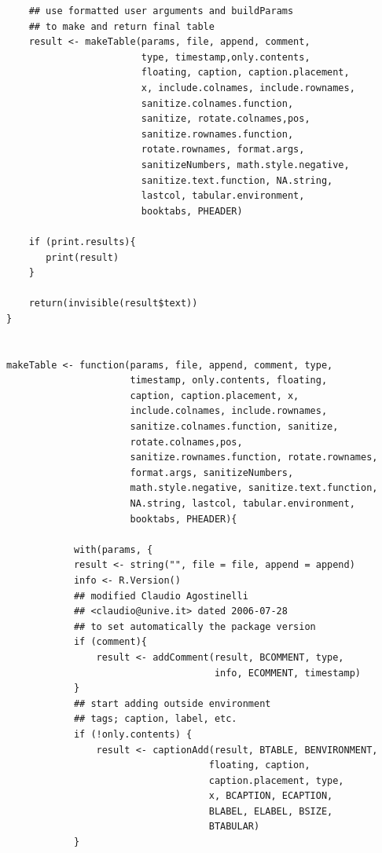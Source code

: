 \documentclass{memoir}\usepackage[]{graphicx}\usepackage[]{color}
\begin{document}
\begin{lstlisting}
    ## use formatted user arguments and buildParams 
    ## to make and return final table
    result <- makeTable(params, file, append, comment, 
                        type, timestamp,only.contents, 
                        floating, caption, caption.placement, 
                        x, include.colnames, include.rownames, 
                        sanitize.colnames.function, 
                        sanitize, rotate.colnames,pos, 
                        sanitize.rownames.function, 
                        rotate.rownames, format.args, 
                        sanitizeNumbers, math.style.negative, 
                        sanitize.text.function, NA.string, 
                        lastcol, tabular.environment, 
                        booktabs, PHEADER)

    if (print.results){
       print(result)
    }

    return(invisible(result$text))
}


makeTable <- function(params, file, append, comment, type, 
                      timestamp, only.contents, floating, 
                      caption, caption.placement, x, 
                      include.colnames, include.rownames, 
                      sanitize.colnames.function, sanitize, 
                      rotate.colnames,pos, 
                      sanitize.rownames.function, rotate.rownames, 
                      format.args, sanitizeNumbers, 
                      math.style.negative, sanitize.text.function, 
                      NA.string, lastcol, tabular.environment, 
                      booktabs, PHEADER){

            with(params, {
            result <- string("", file = file, append = append)
            info <- R.Version()
            ## modified Claudio Agostinelli 
            ## <claudio@unive.it> dated 2006-07-28
            ## to set automatically the package version
            if (comment){
                result <- addComment(result, BCOMMENT, type, 
                                     info, ECOMMENT, timestamp) 
            }
            ## start adding outside environment 
            ## tags; caption, label, etc.
            if (!only.contents) {                                                                 
                result <- captionAdd(result, BTABLE, BENVIRONMENT, 
                                    floating, caption, 
                                    caption.placement, type, 
                                    x, BCAPTION, ECAPTION, 
                                    BLABEL, ELABEL, BSIZE, 
                                    BTABULAR)               
            }
         

\end{lstlisting}
\end{document}
